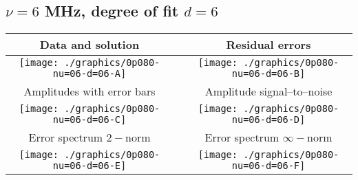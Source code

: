 

% 

\clearpage{}
\break{}

\subsection{$\nu = 6$ MHz, degree of fit $d = 6$}

\begin{table}[h]
    \begin{center}
        \begin{tabular}{ccc}
            Data and solution & \quad & Residual errors \\\hline
            \texttt{[image: ./graphics/0p080-nu=06-d=06-A]} &&
            \texttt{[image: ./graphics/0p080-nu=06-d=06-B]} \\[15pt]
            Amplitudes with error bars && Amplitude signal--to--noise \\\hline
            \texttt{[image: ./graphics/0p080-nu=06-d=06-C]} &&
            \texttt{[image: ./graphics/0p080-nu=06-d=06-D]} \\[15pt]
            Error spectrum $2-$norm && Error spectrum $\infty-$norm \\\hline
            \texttt{[image: ./graphics/0p080-nu=06-d=06-E]} &&
            \texttt{[image: ./graphics/0p080-nu=06-d=06-F]} \\[15pt]
        \end{tabular}
    \end{center}
\label{fig:elev=80, nu=6}
\end{table}



\endinput
